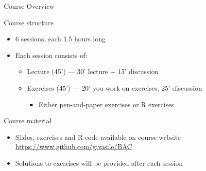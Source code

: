 \documentclass{beamer}
\begin{document}
\begin{frame}{Course Overview}
  \begin{block}{Course structure}
    \begin{itemize}
      \item 6 sessions, each 1.5 hours long
      \item Each session consists of:
        \begin{itemize}
          \item Lecture (45') --- 30' lecture + 15' discussion
          \item Exercises (45') --- 20' you work on exercises, 25' discussion
            \begin{itemize}
            \item Either pen-and-paper exercises or R exercises
              \end{itemize}
        \end{itemize}
      \end{itemize}
    \end{block}
    \vspace{1em}
    \begin{block}{Course material}
      \begin{itemize}
      \item Slides, exercises and R code available on course website
        \url{https://www.github.com/givasile/BAC}
      \item Solutions to exercises will be provided after each session
      \end{itemize}
      \end{block}
    \end{frame}
\end{document}
